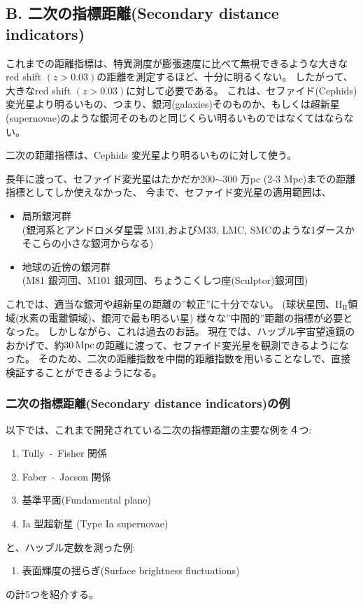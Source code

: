 \documentclass[12pt,a4paper]{article}
\theoremstyle{plain}
\theoremstyle{break}
\begin{document}
\setcounter{part}{0}
\setcounter{section}{3}
\subsection*{B. 二次の指標距離(Secondary distance indicators)}
これまでの距離指標は、特異測度が膨張速度に比べて無視できるような大きなred shift $(z> 0.03)$の距離を測定するほど、十分に明るくない。
したがって、大きなred shift $(z> 0.03)$に対して必要である。
これは、セファイド(Cephids)変光星より明るいもの、つまり、銀河(galaxies)そのものか、もしくは超新星(supernovae)のような銀河そのものと同じくらい明るいものではなくてはならない。
\begin{object}
  二次の距離指標は、Cephids 変光星より明るいものに対して使う。
\end{object}

長年に渡って、セファイド変光星はたかだか200$\sim$300 万pc (2-3 Mpc)までの距離指標としてしか使えなかった、
今まで、セファイド変光星の適用範囲は、
\begin{itemize}
  \item 局所銀河群\\
        (銀河系とアンドロメダ星雲 M31,およびM33, LMC, SMCのような1ダースかそこらの小さな銀河からなる)
  \item 地球の近傍の銀河群\\
        (M81 銀河団、M101 銀河団、ちょうこくしつ座(Sculptor)銀河団)
\end{itemize}
これでは、適当な銀河や超新星の距離の”較正”に十分でない。
(球状星団、$\mathrm{H_{II}}$領域(水素の電離領域)、銀河で最も明るい星)
様々な”中間的”距離の指標が必要となった。
しかしながら、これは過去のお話。
現在では、ハッブル宇宙望遠鏡のおかげで、約$30\,\rm{Mpc}$の距離に渡って、セファイド変光星を観測できるようになった。
そのため、二次の距離指数を中間的距離指数を用いることなしで、直接検証することができるようになる。

\subsubsection{二次の指標距離(Secondary distance indicators)の例}
以下では、これまで開発されている二次の指標距離の主要な例を４つ:
\begin{enumerate}
  \item Tully \,-\, Fisher 関係
  \item Faber \,-\, Jacson 関係
  \item 基準平面(Fundamental plane)
  \item Ia 型超新星 (Type Ia supernovae)
\end{enumerate}
と、ハッブル定数を測った例:
\begin{enumerate}
\renewcommand{\labelenumi}{\arabic{enumi}.}
\setcounter{enumi}{4}
  \item 表面輝度の揺らぎ(Surface brightness fluctuations)
\end{enumerate}
の計5つを紹介する。
\end{document}
